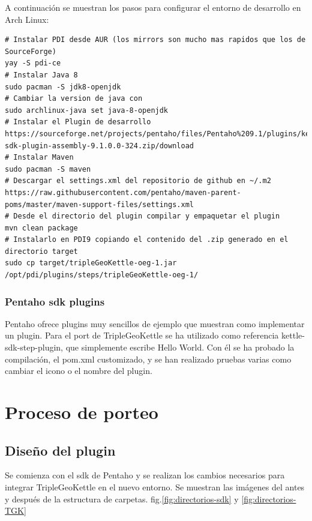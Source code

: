 

A continuación se muestran los pasos para configurar el entorno de desarrollo en Arch Linux:

\begin{lstlisting}
# Instalar PDI desde AUR (los mirrors son mucho mas rapidos que los de SourceForge)
yay -S pdi-ce
# Instalar Java 8
sudo pacman -S jdk8-openjdk
# Cambiar la version de java con
sudo archlinux-java set java-8-openjdk
# Instalar el Plugin de desarrollo
https://sourceforge.net/projects/pentaho/files/Pentaho%209.1/plugins/kettle-sdk-plugin-assembly-9.1.0.0-324.zip/download
# Instalar Maven
sudo pacman -S maven
# Descargar el settings.xml del repositorio de github en ~/.m2
https://raw.githubusercontent.com/pentaho/maven-parent-poms/master/maven-support-files/settings.xml
# Desde el directorio del plugin compilar y empaquetar el plugin
mvn clean package
# Instalarlo en PDI9 copiando el contenido del .zip generado en el directorio target
sudo cp target/tripleGeoKettle-oeg-1.jar /opt/pdi/plugins/steps/tripleGeoKettle-oeg-1/
\end{lstlisting}

\subsubsection{Pentaho sdk plugins}

Pentaho ofrece plugins\cite{pdi-sdk} muy sencillos de ejemplo que muestran como implementar un plugin. Para el
port de TripleGeoKettle se ha utilizado como referencia kettle-sdk-step-plugin, que simplemente escribe Hello
World. Con él se ha probado la compilación, el pom.xml customizado, y se han realizado pruebas varias como
cambiar el icono o el nombre del plugin.


\section{Proceso de porteo}

\subsection{Diseño del plugin}



Se comienza con el sdk de Pentaho y se realizan los cambios necesarios para integrar TripleGeoKettle en el nuevo
entorno. Se muestran las imágenes del antes y después de la estructura de carpetas. fig.\ref{fig:directorios-sdk}
y \ref{fig:directorios-TGK}

